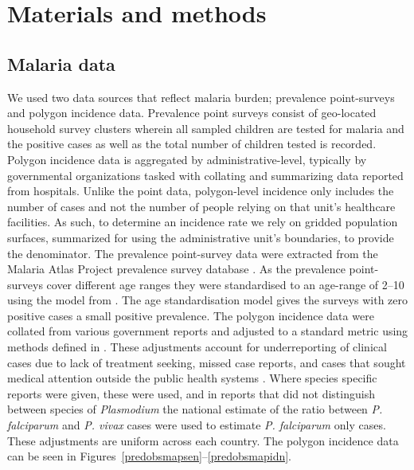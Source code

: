 \documentclass{statsoc}
\begin{document}




\section*{Materials and methods}


\subsection*{Malaria data}

We used two data sources that reflect malaria burden; prevalence point-surveys and polygon incidence data.
Prevalence point surveys consist of geo-located household survey clusters wherein all sampled children are tested for malaria and the positive cases as well as the total number of children tested is recorded. 
Polygon incidence data is aggregated by administrative-level, typically by governmental organizations tasked with collating and summarizing data reported from hospitals. 
Unlike the point data, polygon-level incidence only includes the number of cases and not the number of people relying on that unit’s healthcare facilities.  
As such, to determine an incidence rate we rely on gridded population surfaces, summarized for using the administrative unit’s boundaries, to provide the denominator. 
The prevalence point-survey data were extracted from the Malaria Atlas Project prevalence survey database  \citep{bhatt2015effect, guerra2007assembling, pfeffer2018ma}. 
As the prevalence point-surveys cover different age ranges they were standardised to an age-range of 2--10 using the model from \citep{smith2007standardizing}. 
The age standardisation model gives the surveys with zero positive cases a small positive prevalence. 
The polygon incidence data were collated from various government reports and adjusted to a standard metric using methods defined in \citep{cibulskis2011worldwide, weiss2019mapping}. 
These adjustments account for underreporting of clinical cases due to lack of treatment seeking, missed case reports, and cases that sought medical attention outside the public health systems \citep{battle2016treatment}. 
Where species specific reports were given, these were used, and in reports that did not distinguish between species of \emph{Plasmodium} the national estimate of the ratio between \emph{P. falciparum} and \emph{P. vivax} cases were used to estimate \emph{P. falciparum} only cases. 
These adjustments are uniform across each country. 
The polygon incidence data can be seen in Figures~\ref{predobsmapsen}--\ref{predobsmapidn}.
\end{document}
